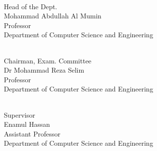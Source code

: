 \documentclass{standalone}
\begin{document}
\begin{titlepage}
				\begin{multicols}{3}
				
				\begin{flushleft}
				\hrulefill \\
				{\hspace{0.5mm}Head of the Dept.\\\hspace{0.5mm}Mohammad Abdullah Al Mumin \\\hspace{0.5mm}Professor\\\hspace{0.5mm}Department of Computer Science and Engineering}\\
				\end{flushleft}
				
				\begin{flushleft}
				\hrulefill \\
					{\hspace{0.5mm}Chairman, Exam. Committee\\\hspace{0.5mm}Dr Mohammad Reza Selim\\\hspace{0.5mm}Professor\\\hspace{0.5mm}Department of Computer Science and Engineering}\\%
					
				\end{flushleft}
				
				\begin{flushleft}
				\hrulefill \\
					\hspace{0.5mm}Supervisor\\Enamul Hassan\\Assistant Professor\\\hspace{0.5mm}Department of Computer Science and Engineering\\
				\end{flushleft}
				\end{multicols}
\end{titlepage}
\end{document}
